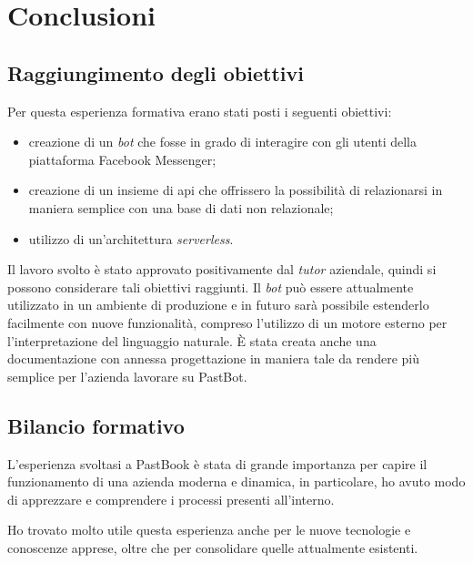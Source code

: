 
\chapter{Conclusioni}

\section{Raggiungimento degli obiettivi}

Per questa esperienza formativa erano stati posti i seguenti obiettivi:
\begin{itemize}
  \item creazione di un \textit{bot} che fosse in grado di interagire con gli
utenti della piattaforma Facebook Messenger;
  \item creazione di un insieme di \gls{api} che offrissero la possibilità di
relazionarsi in maniera semplice con una base di dati non relazionale;
  \item utilizzo di un'architettura \textit{serverless}.
\end{itemize}

Il lavoro svolto è stato approvato positivamente dal \textit{tutor} aziendale,
quindi si possono considerare tali obiettivi raggiunti.
Il \textit{bot} può essere attualmente utilizzato in un ambiente di produzione e
in futuro sarà possibile estenderlo facilmente con nuove funzionalità, compreso
l'utilizzo di un motore esterno per l'interpretazione del linguaggio naturale.
È stata creata anche una documentazione con annessa progettazione in maniera
tale da rendere più semplice per l'azienda lavorare su PastBot.

\section{Bilancio formativo}

L'esperienza svoltasi a PastBook è stata di grande importanza per capire il
funzionamento di una azienda moderna e dinamica, in particolare, ho avuto modo
di apprezzare e comprendere i processi presenti all'interno.


Ho trovato molto utile questa esperienza anche per le nuove tecnologie e
conoscenze apprese, oltre che per consolidare quelle attualmente esistenti.

